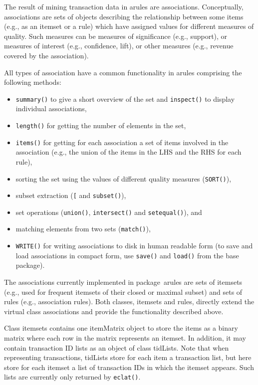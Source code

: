 \documentclass[10pt,a4paper]{article}
\newcommand{\strong}[1]{{\normalfont\fontseries{b}\selectfont #1}}
\newcommand{\class}[1]{\mbox{\textsf{#1}}}
\newcommand{\func}[1]{\mbox{\texttt{#1()}}}
\newcommand{\code}[1]{\mbox{\texttt{#1}}}
\newcommand{\pkg}[1]{\strong{#1}}
\begin{document}
The result of mining transaction data in \pkg{arules} are
\class{associations.}  Conceptually, associations are sets of objects
describing the relationship between some items (e.g., as an itemset or a
rule) which have assigned values for different measures of quality.
Such measures can be measures of significance (e.g., support), or
measures of interest (e.g., confidence, lift), or other measures (e.g.,
revenue covered by the association).

All types of association have a common functionality in \pkg{arules} comprising
the following methods:
\begin{itemize}
 \item \func{summary} to give a short overview of the set and
  \func{inspect} to display individual associations,
 \item \func{length} for getting the number of elements in the set,
 \item \func{items} for getting for each association a set of items
  involved in the association (e.g., the union of the items in the LHS
  and the RHS for each rule),
 \item sorting the set using the values of different quality measures
  (\func{SORT}),
 \item subset extraction (\code{[} and \func{subset}),
 \item set operations (\func{union}, \func{intersect} and
  \func{setequal}), and
 \item matching elements from two sets (\func{match}),
\item \func{WRITE} for writing associations to disk in human readable form 
  (to save and load associations in compact form, 
  use \func{save} and \func{load} from the
  \pkg{base} package).
\end{itemize}

The associations currently implemented in package~\pkg{arules} are sets
of itemsets (e.g., used for frequent itemsets of their closed or maximal
subset) and sets of rules (e.g., association rules).  Both classes,
\class{itemsets} and \class{rules}, directly extend the virtual class
\class{associations} and provide the functionality described above.

Class \class{itemsets} contains one \class{itemMatrix} object to store
the items as a binary matrix where each row in the matrix represents an
itemset. In addition, it may contain transaction ID lists as an object
of class \class{tidLists}.  Note that when representing transactions,
\class{tidLists} store for each item a transaction list, but here store
for each itemset a list of transaction IDs in which the itemset appears.
Such lists are currently only returned by \func{eclat}.
\end{document}
